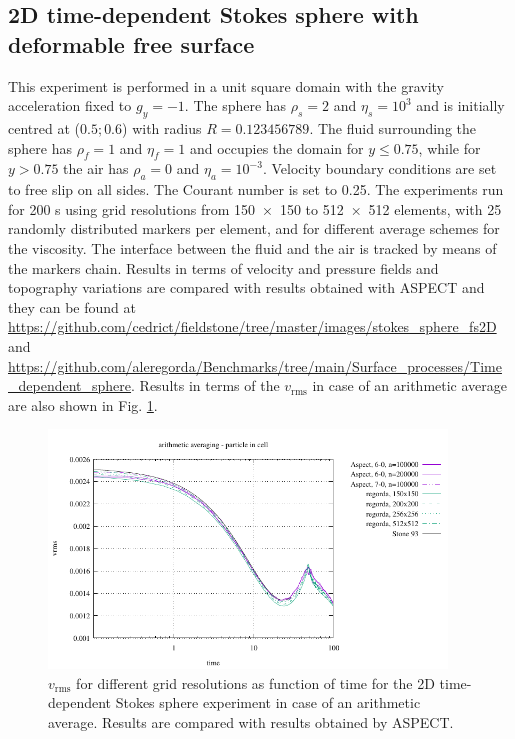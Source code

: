 \documentclass[hidelinks,10pt,a4paper]{article}
\begin{document}
\subsection{2D time-dependent Stokes sphere with deformable free surface}\label{sec:sphere}
This experiment is performed in a unit square domain with the gravity acceleration fixed to $g_y=-1$. The sphere has $\rho_s=2$ and $\eta_s=10^3$ and is
initially centred at ($0.5;0.6$) with radius $R=0.123456789$. The fluid surrounding the sphere has $\rho_f=1$ and $\eta_f=1$ and occupies the domain for
$y\leq 0.75$, while for $y>0.75$ the air has $\rho_a=0$ and $\eta_a=10^{-3}$. Velocity boundary conditions are set to free slip on all sides. The Courant
number is set to 0.25. The experiments run for 200 s using grid resolutions from \num{150x150} to \num{512x512} elements, with 25 randomly distributed markers
per element, and for different average schemes for the viscosity. The interface between the fluid and the air is tracked by means of the markers chain. Results
in terms of velocity and pressure fields and topography variations are compared with results obtained with ASPECT
\citep{Kronbichler2012,Heister2017,Bangerth2020,Bangerth2020a} and they can be found at
\url{https://github.com/cedrict/fieldstone/tree/master/images/stokes_sphere_fs2D} and
\url{https://github.com/aleregorda/Benchmarks/tree/main/Surface_processes/Time_dependent_sphere}. Results in terms of the $v_{\textrm{rms}}$ in case of 
an arithmetic average are also shown in Fig. \ref{fig:inst_spherefs}.

\begin{figure}
\centering
\noindent\includegraphics[width=400px]{./Figures/vrms_arithm.pdf}
\caption{$v_{\textrm{rms}}$ for different grid resolutions as function of time for the 2D time-dependent Stokes sphere experiment in case of an arithmetic average.
Results are compared with results obtained by ASPECT.}
\label{fig:inst_spherefs}
\end{figure}
\end{document}
